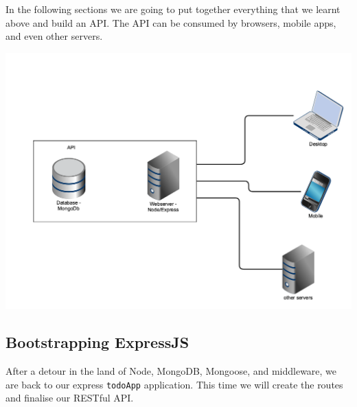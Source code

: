 \documentclass[12pt]{article}
\begin{document}
In the following sections we are going to put together everything that we
learnt above and build an API. The API can be consumed by browsers, mobile
apps, and even other servers. 

\includegraphics[width=\textwidth]{images/api_uses.png}

\subsection{Bootstrapping ExpressJS}

After a detour in the land of Node, MongoDB, Mongoose, and middleware,
we are back to our express \verb!todoApp! application. This time we will create the routes and
finalise our RESTful API.
\end{document}
